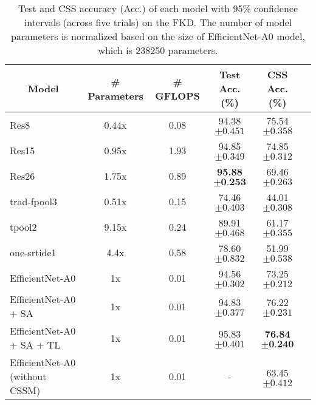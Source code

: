 \documentclass{article}
\begin{document}
\begin{table*}[!]\centering
\caption{Test and CSS accuracy (Acc.) of each model with 95\% confidence intervals (across five trials) on the FKD. The number of model parameters is normalized based on the size of EfficientNet-A0 model, which is 238250 parameters.}
\label{tbl:result}
\begin{tabular}{lccccl}
\hline
\multicolumn{1}{c}{\textbf{Model}} & \textbf{\# Parameters} &\textbf{\# GFLOPS} & \textbf{Test Acc. (\%)} & \textbf{CSS Acc. (\%)} &  \\
\hline
Res8                               & 0.44x	&0.08                  & 94.38$\pm{0.451}$                 & 75.54$\pm{0.358}$                   &  \\
Res15                              & 0.95x 	&1.93                 & 94.85$\pm{0.349}$              & 74.85$\pm{0.312}$                   &  \\
Res26                              & 1.75x 	&0.89                 & \textbf{95.88}$\pm{\textbf{0.253}}$           & 69.46$\pm{0.263}$                  &  \\
trad-fpool3                        & 0.51x 	&0.15                & 74.46$\pm{0.403}$                    & 44.01$\pm{0.308}$                   &  \\
tpool2                             & 9.15x	&0.24                  & 89.91$\pm{0.468}$                    & 61.17$\pm{0.355}$                   &  \\
one-srtide1                        & 4.4x	&0.58                  & 78.60$\pm{0.832}$                    & 51.99$\pm{0.538}$                   &  \\
EfficientNet-A0                    & 1x	&0.01                     & 94.56$\pm{0.302}$                    & 73.25$\pm{0.212}$                   &  \\
EfficientNet-A0 + SA               & 1x	&0.01                     & 94.83$\pm{0.377}$                    & 76.22$\pm{0.231}$                   &  \\
EfficientNet-A0 + SA + TL          & 1x	&0.01                     & 95.83$\pm{0.401}$                    & \textbf{76.84}$\pm{\textbf{0.240}}$         &\\
EfficientNet-A0  (without CSSM)                 & 1x	&0.01                     & -                    & 63.45$\pm{0.412}$                   &  \\
\hline
\end{tabular}
\end{table*}
\end{document}
